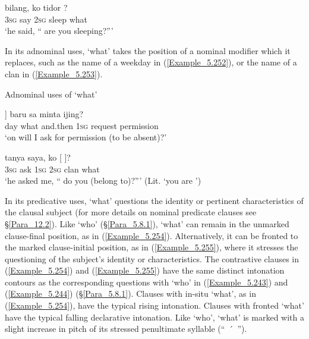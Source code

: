 \ea
\label{Example_5.251}
 {bilang,} {ko} {tidor} {?}\\ %
 \textsc{3sg}  say  \textsc{2sg}  sleep  what\\
\glt 
‘he said, `` are you sleeping?''' \textstyleExampleSource{[081006-034-CvEx.0022]}
\z


In its adnominal uses,  ‘what’ takes the position of a nominal modifier which it replaces, such as the name of a weekday in (\ref{Example_5.252}), or the name of a clan in (\ref{Example_5.253}).


\begin{styleExampleTitle}
Adnominal uses of  ‘what’
\end{styleExampleTitle}

\ea
\label{Example_5.252}
\gll {[\bluebold{hari}} {]} {baru} {sa} {minta} {ijing?}\\ %
 day  what  and.then  \textsc{1sg}  request  permission\\
 ‘on  will I ask for permission (to be absent)?’ \textstyleExampleSource{[080917-003a-CvEx.0003]}
\z

\ea
\label{Example_5.253}
 {tanya} {saya,} {ko} {[} {]?}\\ %
 \textsc{3sg}  ask  \textsc{1sg}  \textsc{2sg}  clan  what\\
\glt 
‘he asked me, `` do you (belong to)?''' (Lit. ‘you are ’) \textstyleExampleSource{[080922-010a-CvNF.0281]}
\z


In its predicative uses,  ‘what’ questions the identity or pertinent characteristics of the clausal subject (for more details on nominal predicate clauses see §\ref{Para_12.2}). Like  ‘who’ (§\ref{Para_5.8.1}),  ‘what’ can remain in the unmarked clause-final position, as in (\ref{Example_5.254}). Alternatively, it can be fronted to the marked clause-initial position, as in (\ref{Example_5.255}), where it stresses the questioning of the subject’s identity or characteristics. The contrastive clauses in (\ref{Example_5.254}) and (\ref{Example_5.255}) have the same distinct intonation contours as the corresponding questions with  ‘who’ in (\ref{Example_5.243}) and (\ref{Example_5.244}) (§\ref{Para_5.8.1}). Clauses with in-situ  ‘what’, as in (\ref{Example_5.254}), have the typical rising  intonation. Clauses with fronted  ‘what’ have the typical falling declarative intonation. Like  ‘who’,  ‘what’ is marked with a slight increase in pitch of its stressed penultimate syllable (“~\'{~}~”).


